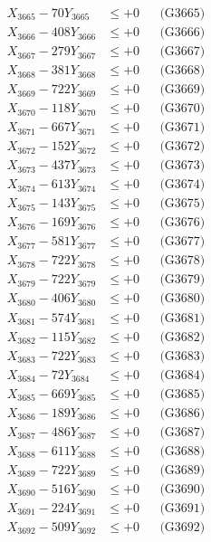 \documentclass[a4paper,10pt]{article}
\begin{document}
{\begin{align}
X_{3665} - 70Y_{3665} &\leq +0 && \text{(G3665)} \\
X_{3666} - 408Y_{3666} &\leq +0 && \text{(G3666)} \\
X_{3667} - 279Y_{3667} &\leq +0 && \text{(G3667)} \\
X_{3668} - 381Y_{3668} &\leq +0 && \text{(G3668)} \\
X_{3669} - 722Y_{3669} &\leq +0 && \text{(G3669)} \\
X_{3670} - 118Y_{3670} &\leq +0 && \text{(G3670)} \\
\allowbreak
X_{3671} - 667Y_{3671} &\leq +0 && \text{(G3671)} \\
X_{3672} - 152Y_{3672} &\leq +0 && \text{(G3672)} \\
X_{3673} - 437Y_{3673} &\leq +0 && \text{(G3673)} \\
X_{3674} - 613Y_{3674} &\leq +0 && \text{(G3674)} \\
X_{3675} - 143Y_{3675} &\leq +0 && \text{(G3675)} \\
X_{3676} - 169Y_{3676} &\leq +0 && \text{(G3676)} \\
X_{3677} - 581Y_{3677} &\leq +0 && \text{(G3677)} \\
X_{3678} - 722Y_{3678} &\leq +0 && \text{(G3678)} \\
X_{3679} - 722Y_{3679} &\leq +0 && \text{(G3679)} \\
X_{3680} - 406Y_{3680} &\leq +0 && \text{(G3680)} \\
\allowbreak
X_{3681} - 574Y_{3681} &\leq +0 && \text{(G3681)} \\
X_{3682} - 115Y_{3682} &\leq +0 && \text{(G3682)} \\
X_{3683} - 722Y_{3683} &\leq +0 && \text{(G3683)} \\
X_{3684} - 72Y_{3684} &\leq +0 && \text{(G3684)} \\
X_{3685} - 669Y_{3685} &\leq +0 && \text{(G3685)} \\
X_{3686} - 189Y_{3686} &\leq +0 && \text{(G3686)} \\
X_{3687} - 486Y_{3687} &\leq +0 && \text{(G3687)} \\
X_{3688} - 611Y_{3688} &\leq +0 && \text{(G3688)} \\
X_{3689} - 722Y_{3689} &\leq +0 && \text{(G3689)} \\
X_{3690} - 516Y_{3690} &\leq +0 && \text{(G3690)} \\
\allowbreak
X_{3691} - 224Y_{3691} &\leq +0 && \text{(G3691)} \\
X_{3692} - 509Y_{3692} &\leq +0 && \text{(G3692)} \\

\end{align}}
\end{document}
